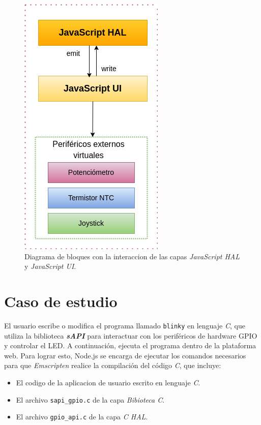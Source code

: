 \begin{figure}[ht]
	\centering
	\includegraphics[scale=.57]{./Figures/uiADC.png}
	\caption{Diagrama de bloques con la interaccion de las capas  \textit{JavaScript HAL} y \textit{JavaScript UI}.}
	\label{fig:uiADC}
\end{figure}


\section{Caso de estudio}
\label{sec:caso_de_estudio}

El usuario escribe o modifica el programa llamado \texttt{blinky} en lenguaje \textit{C}, que utiliza la biblioteca \textit{\textbf{sAPI}} para interactuar con los periféricos de hardware GPIO y controlar el LED. A continuación, ejecuta el programa dentro de la plataforma web. Para lograr esto, Node.js se encarga de ejecutar los comandos necesarios para que \textit{Emscripten} realice la compilación del código \textit{C}, que incluye: 

\begin{itemize}
	\item El codigo de la aplicacion de usuario escrito en lenguaje \textit{C}.
	\item El archivo \texttt{sapi\_gpio.c} de la capa \textit{Bibioteca C}.
	\item El archivo \texttt{gpio\_api.c} de la capa \textit{C HAL}.
\end{itemize} 

